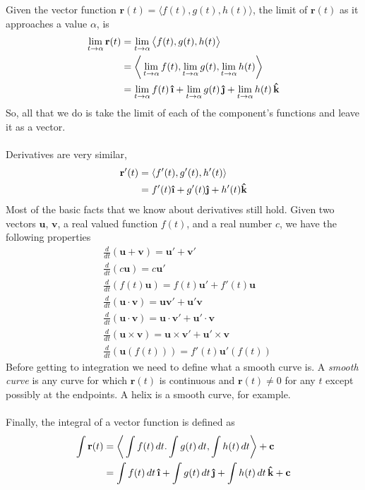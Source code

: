 \documentclass[10pt,reqno]{book}
\theoremstyle{definition}
\renewcommand{\vec}[1]{\mathbf{#1}}
\newcommand{\uvec}[1]{\boldsymbol{\hat{\textbf{#1}}}}
\begin{document}
	Given the vector function $ \vec{r}(t) = \langle f(t),g(t),h(t) \rangle $, the limit of $ \vec{r}(t) $ as it approaches a value $ \alpha $, is
	\begin{align*}
		\lim_{t \to \alpha} \vec{r}(t) &= \lim_{t \to \alpha} \big\langle f(t),g(t),h(t) \big\rangle\\
		&= \bigg\langle \lim_{t \to \alpha} f(t), \lim_{t \to \alpha} g(t), \lim_{t \to \alpha} h(t) \bigg\rangle\\
		&= \lim_{t \to \alpha} f(t)\,\uvec{\i} + \lim_{t \to \alpha} g(t)\,\uvec{\j} + \lim_{t \to \alpha} h(t)\,\uvec{k}
	\end{align*}
	So, all that we do is take the limit of each of the component's functions and leave it as a vector.\\ \\
	Derivatives are very similar, 
	\begin{align*}
		\vec{r}'(t) &= \langle f'(t),g'(t),h'(t) \rangle\\
					&= f'(t)\uvec{\i} + g'(t)\uvec{\j} + h'(t)\uvec{k}
	\end{align*}
	Most of the basic facts that we know about derivatives still hold. Given two vectors $ \vec{u} $, $ \vec{v} $, a real valued function $ f(t) $, and a real number $ c $, we have the following properties
	\begin{align*}
		& \frac{d}{dt}(\vec{u} + \vec{v}) = \vec{u}' + \vec{v}'\\
		& \frac{d}{dt}(c\vec{u}) = c\vec{u}'\\
		& \frac{d}{dt}(f(t)\vec{u}) = f(t)\vec{u}' + f'(t)\vec{u}\\
		& \frac{d}{dt}(\vec{u} \cdot \vec{v}) = \vec{u}\vec{v}' + \vec{u}'\vec{v}\\
		& \frac{d}{dt}(\vec{u} \cdot \vec{v}) = \vec{u} \cdot \vec{v}' + \vec{u}' \cdot \vec{v}\\
		& \frac{d}{dt}(\vec{u} \times \vec{v}) = \vec{u} \times \vec{v}' + \vec{u}' \times \vec{v}\\
		& \frac{d}{dt}(\vec{u}(f(t))) = f'(t)\vec{u}'(f(t))
	\end{align*}
	Before getting to integration we need to define what a smooth curve is. A \textit{smooth curve} is any curve for which $ \vec{r}(t) $  is continuous and $ \vec{r}(t) \neq 0 $ for any $ t $ except possibly at the endpoints. A helix is a smooth curve, for example.\\ \\
	Finally, the integral of a vector function is defined as
	\begin{align*}
		\int \vec{r}(t) &= \bigg\langle \int f(t)\,dt. \int g(t)\,dt, \int h(t)\,dt \bigg\rangle + \vec{c}\\
		&= \int f(t)\,dt\,\uvec{\i} + \int g(t)\,dt\,\uvec{\j} + \int h(t)\,dt\,\uvec{k} + \vec{c}
	\end{align*}
\end{document}
